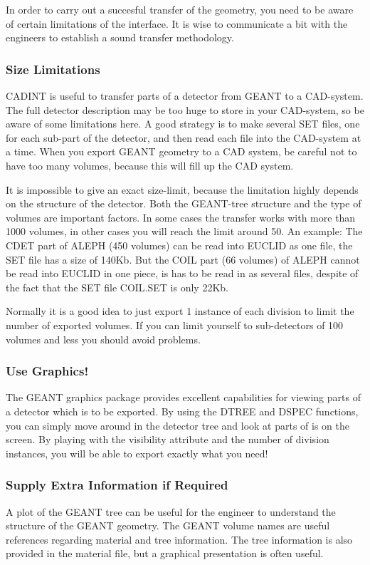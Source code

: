 {In order to carry out a succesful transfer of the geometry, you need to be
aware of certain limitations of the interface.  It is wise to communicate
a bit with the engineers to establish a sound transfer methodology.
 
 
\subsubsection*{Size Limitations}
 
CADINT is useful to transfer parts of a detector from GEANT
to a CAD-system.  The full detector description may be too huge
to store in your
CAD-system, so be aware of some limitations here.
A good strategy is to make several SET files, one for each sub-part of the
detector, and then read each file into the CAD-system at a time.
When you export GEANT geometry to a CAD system, be careful not to have
too many volumes, because this will fill up the CAD system.
 
It is impossible to give an exact size-limit, because the limitation
highly depends on the structure of the detector.  Both the GEANT-tree structure
and the type of volumes are important factors. In some cases the
transfer works with  more than 1000 volumes, in other cases you
will reach the limit around 50.
An example: The CDET part of ALEPH (450 volumes) can be read into
EUCLID as one file, the SET file has a size of 140Kb.  But the COIL
part (66 volumes) of ALEPH cannot be read into EUCLID in one piece,
is has to be read in as several files, despite of the fact that the
SET file COIL.SET is only 22Kb.
 
Normally it is a good idea to just export 1 instance of each division
to limit the number of exported volumes.  If you can limit yourself to
sub-detectors of 100 volumes and less you should avoid problems.
 
\subsubsection*{Use Graphics!}
 
The GEANT graphics package  provides excellent capabilities for
viewing parts of a detector which is to be exported.  By using the
DTREE and DSPEC functions, you can simply move
around in the detector tree and look at parts of is on the screen.  By
playing with the visibility attribute and the number of division instances, you
 will be able to export exactly what you need!
 
\subsubsection*{Supply Extra Information if Required}
A plot of the GEANT tree can be useful for the engineer to understand the
structure of the GEANT geometry.  The GEANT volume names are useful references
regarding material and tree information. The tree information is also
provided in the material file, but a graphical presentation is often useful.
 
}
